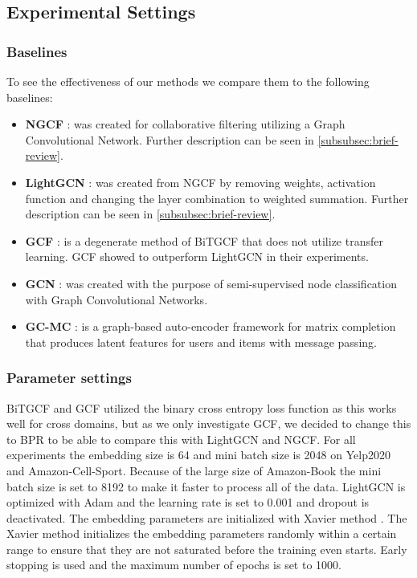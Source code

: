 \subsection{Experimental Settings}

\subsubsection{Baselines}
To see the effectiveness of our methods we compare them to the following baselines:
\begin{itemize}
    \item \textbf{NGCF} \cite{NGCF_2019}: was created for collaborative filtering utilizing a Graph Convolutional Network. Further description can be seen in \autoref{subsubsec:brief-review}.
    \item \textbf{LightGCN} \cite{lightgcn}: was created from NGCF by removing weights, activation function and changing the layer combination to weighted summation. Further description can be seen in \autoref{subsubsec:brief-review}.
    \item \textbf{GCF} \cite{BiTGCF}: is a degenerate method of BiTGCF that does not utilize transfer learning. GCF showed to outperform LightGCN in their experiments.
    \item \textbf{GCN} \cite{GCN}: was created with the purpose of semi-supervised node classification with Graph Convolutional Networks.
    \item \textbf{GC-MC} \cite{GC_MC}: is a graph-based auto-encoder framework for matrix completion that produces latent features for users and items with message passing.
\end{itemize}

\subsubsection{Parameter settings}
BiTGCF and GCF utilized the binary cross entropy loss function as this works well for cross domains, but as we only investigate GCF, we decided to change this to BPR to be able to compare this with LightGCN and NGCF.
For all experiments the embedding size is 64 and mini batch size is 2048 on Yelp2020 and Amazon-Cell-Sport.
Because of the large size of Amazon-Book the mini batch size is set to 8192 to make it faster to process all of the data.
LightGCN is optimized with Adam \cite{Adam} and the learning rate is set to 0.001 and dropout is deactivated.
The embedding parameters are initialized with Xavier method \cite{Xavier,lightgcn}.
The Xavier method initializes the embedding parameters randomly within a certain range to ensure that they are not saturated before the training even starts.
Early stopping is used and the maximum number of epochs is set to 1000.
